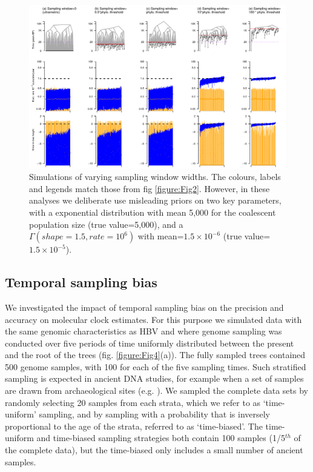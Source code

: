 \documentclass[11pt]{article}
\begin{document}
\begin{landscape}
	\begin{figure}[H]
		\begin{center}
			\includegraphics[scale=0.7, angle=0]{summary_all_estimates_misleading_prior.pdf}
			\caption{Simulations of varying sampling window widths. The colours, labels and legends match those from fig \ref{figure:Fig2}. However, in these analyses we deliberate use misleading priors on two key parameters, with a exponential distribution with mean 5,000 for the coalescent population size (true value=5,000), and a $\Gamma(shape=1.5, rate=10^{6})$ with mean=$1.5\times10^{-6}$ (true value=$1.5\times10^{-5}$).}
			\label{figure:Fig3}
		\end{center}
	\end{figure}
\end{landscape}


\subsection{Temporal sampling bias}
We investigated the impact of temporal sampling bias on the precision and accuracy on molecular clock estimates. For this purpose we simulated data with the same genomic characteristics as HBV and where genome sampling was conducted over five periods of time uniformly distributed between the present and the root of the trees (fig. \ref{figure:Fig4}(a)). The fully sampled trees contained 500 genome samples, with 100 for each of the five sampling times. Such stratified sampling is expected in ancient DNA studies, for example when a set of samples are drawn from archaeological sites (e.g. \cite{spyrou2019phylogeography}). We sampled the complete data sets by randomly selecting 20 samples from each strata, which we refer to as `time-uniform' sampling, and by sampling with a probability that is inversely proportional to the age of the strata, referred to as `time-biased'. The time-uniform and time-biased sampling strategies both contain 100 samples (1/5$^{th}$ of the complete data), but the time-biased only includes a small number of ancient samples.
\end{document}
